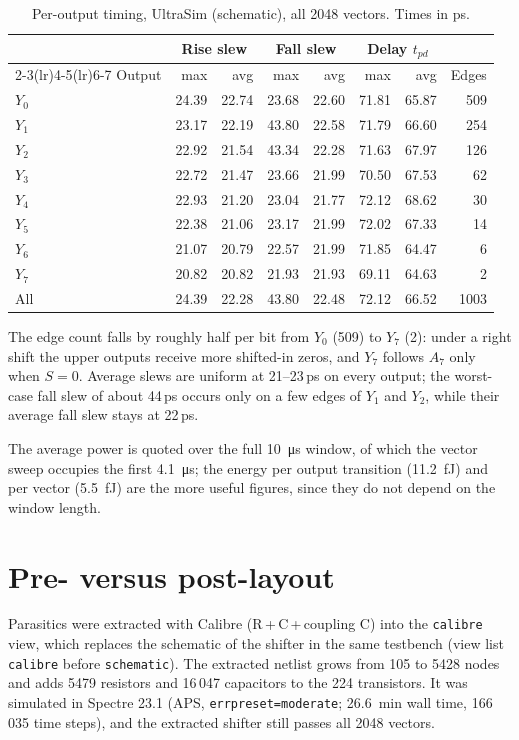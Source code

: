 \documentclass[11pt]{article}
\begin{document}
\begin{table}[H]
\centering
\caption{Per-output timing, UltraSim (schematic), all 2048 vectors. Times in ps.}
\label{tab:perout}
\begin{tabular}{lrrrrrrr}
\toprule
 & \multicolumn{2}{c}{Rise slew} & \multicolumn{2}{c}{Fall slew} & \multicolumn{2}{c}{Delay $t_{pd}$} & \\
\cmidrule(lr){2-3}\cmidrule(lr){4-5}\cmidrule(lr){6-7}
Output & max & avg & max & avg & max & avg & Edges \\
\midrule
$Y_0$ & 24.39 & 22.74 & 23.68 & 22.60 & 71.81 & 65.87 & 509 \\
$Y_1$ & 23.17 & 22.19 & 43.80 & 22.58 & 71.79 & 66.60 & 254 \\
$Y_2$ & 22.92 & 21.54 & 43.34 & 22.28 & 71.63 & 67.97 & 126 \\
$Y_3$ & 22.72 & 21.47 & 23.66 & 21.99 & 70.50 & 67.53 & 62 \\
$Y_4$ & 22.93 & 21.20 & 23.04 & 21.77 & 72.12 & 68.62 & 30 \\
$Y_5$ & 22.38 & 21.06 & 23.17 & 21.99 & 72.02 & 67.33 & 14 \\
$Y_6$ & 21.07 & 20.79 & 22.57 & 21.99 & 71.85 & 64.47 & 6 \\
$Y_7$ & 20.82 & 20.82 & 21.93 & 21.93 & 69.11 & 64.63 & 2 \\
\midrule
All & 24.39 & 22.28 & 43.80 & 22.48 & 72.12 & 66.52 & 1003 \\
\bottomrule
\end{tabular}
\end{table}

The edge count falls by roughly half per bit from $Y_0$ (509) to $Y_7$ (2):
under a right shift the upper outputs receive more shifted-in zeros, and
$Y_7$ follows $A_7$ only when $S=0$. Average slews are uniform at
21--23\,ps on every output; the worst-case fall slew of about 44\,ps occurs
only on a few edges of $Y_1$ and $Y_2$, while their average fall slew stays
at 22\,ps.

The average power is quoted over the full \SI{10}{\micro s} window, of which
the vector sweep occupies the first \SI{4.1}{\micro s}; the energy per output
transition (\SI{11.2}{fJ}) and per vector (\SI{5.5}{fJ}) are the more useful
figures, since they do not depend on the window length.

\section{Pre- versus post-layout}
Parasitics were extracted with Calibre (R\,+\,C\,+\,coupling C) into the
\texttt{calibre} view, which replaces the schematic of the shifter in the same
testbench (view list \texttt{calibre} before \texttt{schematic}). The
extracted netlist grows from 105 to 5428 nodes and adds 5479 resistors and
16\,047 capacitors to the 224 transistors. It was simulated in Spectre 23.1
(APS, \texttt{errpreset=moderate}; \SI{26.6}{min} wall time, 166\,035 time
steps), and the extracted shifter still passes all 2048 vectors.
\end{document}
